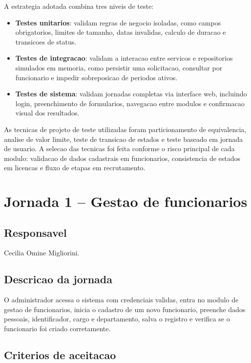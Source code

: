 \documentclass[12pt,a4paper]{article}
\providecommand{\PessoaUm}{Cecilia Omine Migliorini}
\begin{document}
A estrategia adotada combina tres niveis de teste:

\begin{itemize}
    \item \textbf{Testes unitarios}: validam regras de negocio isoladas, como campos obrigatorios, limites de tamanho, datas invalidas, calculo de duracao e transicoes de status.
    \item \textbf{Testes de integracao}: validam a interacao entre servicos e repositorios simulados em memoria, como persistir uma solicitacao, consultar por funcionario e impedir sobreposicao de periodos ativos.
    \item \textbf{Testes de sistema}: validam jornadas completas via interface web, incluindo login, preenchimento de formularios, navegacao entre modulos e confirmacao visual dos resultados.
\end{itemize}

As tecnicas de projeto de teste utilizadas foram particionamento de equivalencia, analise de valor limite, teste de transicao de estados e teste baseado em jornada de usuario. A selecao das tecnicas foi feita conforme o risco principal de cada modulo: validacao de dados cadastrais em funcionarios, consistencia de estados em licencas e fluxo de etapas em recrutamento.

\newpage
\section{Jornada 1 -- Gestao de funcionarios}

\subsection{Responsavel}

\PessoaUm.

\subsection{Descricao da jornada}

O administrador acessa o sistema com credenciais validas, entra no modulo de gestao de funcionarios, inicia o cadastro de um novo funcionario, preenche dados pessoais, identificador, cargo e departamento, salva o registro e verifica se o funcionario foi criado corretamente.

\subsection{Criterios de aceitacao}
\end{document}
